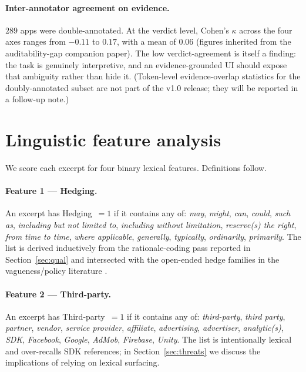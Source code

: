 \documentclass[11pt,a4paper]{article}
\begin{document}
\paragraph{Inter-annotator agreement on evidence.}\label{sec:agreement}
$289$ apps were double-annotated. At the verdict level, Cohen's
$\kappa$ across the four axes ranges from $-0.11$ to $0.17$, with a
mean of $0.06$ (figures inherited from the auditability-gap companion
paper). The low verdict-agreement is itself a finding: the task is
genuinely interpretive, and an evidence-grounded UI should expose
that ambiguity rather than hide it. (Token-level evidence-overlap
statistics for the doubly-annotated subset are not part of the
v1.0 release; they will be reported in a follow-up note.)

\section{Linguistic feature analysis}\label{sec:linguistics}
We score each excerpt for four binary lexical features. Definitions
follow.

\paragraph{Feature 1 --- Hedging.}
An excerpt has Hedging~$=1$ if it contains any of:
\emph{may}, \emph{might}, \emph{can}, \emph{could}, \emph{such as},
\emph{including but not limited to}, \emph{including without
limitation}, \emph{reserve(s) the right}, \emph{from time to time},
\emph{where applicable}, \emph{generally}, \emph{typically},
\emph{ordinarily}, \emph{primarily}. The list is derived
inductively from the rationale-coding pass reported in
Section~\ref{sec:qual} and intersected with the open-ended hedge
families in the vagueness/policy literature
\citep{bhatia2016theory,fabian2017large,sathyendra2017identifying}.

\paragraph{Feature 2 --- Third-party.}
An excerpt has Third-party~$=1$ if it contains any of:
\emph{third-party}, \emph{third party}, \emph{partner},
\emph{vendor}, \emph{service provider}, \emph{affiliate},
\emph{advertising}, \emph{advertiser}, \emph{analytic(s)},
\emph{SDK}, \emph{Facebook}, \emph{Google}, \emph{AdMob}, \emph{Firebase},
\emph{Unity}. The list is intentionally lexical and over-recalls
SDK references; in Section~\ref{sec:threats} we discuss the
implications of relying on lexical surfacing.
\end{document}
